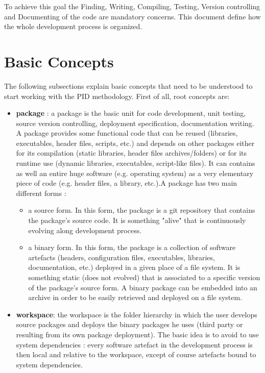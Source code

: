 \documentclass[12pt,a4paper]{article}
\begin{document}
To achieve this goal the Finding, Writing, Compiling, Testing, Version controlling and Documenting of the code are mandatory concerns. This document define how the whole development process is organized.

\section{Basic Concepts}

The following subsections explain basic concepts that need to be understood to start working with the PID methodology. First of all, root concepts are:

\begin{itemize}

\item \textbf{package} : a package is the basic unit for code development, unit testing, source version controlling, deployment specification, documentation writing. A package provides some functional code that can be reused (libraries, executables, header files, scripts, etc.) and depends on other packages either for its compilation (static libraries, header files archives/folders) or for its runtime use (dynamic libraries, executables, script-like files). It can contains as well an entire huge software (e.g. operating system) as a very elementary piece of code (e.g. header files, a library, etc.).A package has two main different forms :
\begin{itemize}
\item a source form. In this form, the package is a git repository that contains the  package's source code. It is something "alive" that is continuously evolving along development process.
\item a binary form. In this form, the package is a collection of software artefacts (headers, configuration files, executables, libraries, documentation, etc.) deployed in a given place of a file system. It is something static (does not evolved) that is associated to a specific version of the package's source form. A binary package can be embedded into an archive in order to be easily retrieved and deployed on a file system.
\end{itemize}

\item \textbf{workspace}:  the workspace is the folder hierarchy in which the user develops source packages and deploys the binary packages he uses (third party or resulting from its own package deployment). The basic idea is to avoid to use system dependencies : every software artefact in the development process is then local and relative to the workspace, except of course artefacts bound to system dependencies. 


\end{itemize}
\end{document}
